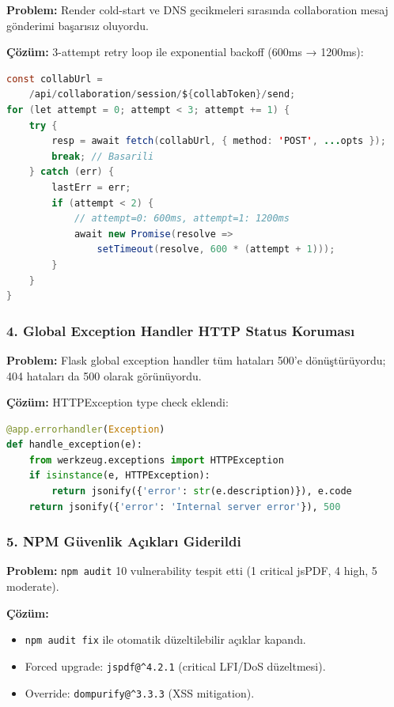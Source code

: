 \documentclass[11pt,a4paper]{article}
\begin{document}
\textbf{Problem:} Render cold-start ve DNS gecikmeleri sırasında collaboration mesaj gönderimi başarısız oluyordu.

\textbf{Çözüm:} 3-attempt retry loop ile exponential backoff (600ms → 1200ms):

\begin{lstlisting}[language=Java, caption={App.jsx:857--885}]
const collabUrl =
    /api/collaboration/session/${collabToken}/send;
for (let attempt = 0; attempt < 3; attempt += 1) {
    try {
        resp = await fetch(collabUrl, { method: 'POST', ...opts });
        break; // Basarili
    } catch (err) {
        lastErr = err;
        if (attempt < 2) {
            // attempt=0: 600ms, attempt=1: 1200ms
            await new Promise(resolve =>
                setTimeout(resolve, 600 * (attempt + 1)));
        }
    }
}
\end{lstlisting}

\subsubsection{4. Global Exception Handler HTTP Status Koruması}

\textbf{Problem:} Flask global exception handler tüm hataları 500'e dönüştürüyordu; 404 hataları da 500 olarak görünüyordu.

\textbf{Çözüm:} HTTPException type check eklendi:

\begin{lstlisting}[language=Python, caption={app.py:532--547}]
@app.errorhandler(Exception)
def handle_exception(e):
    from werkzeug.exceptions import HTTPException
    if isinstance(e, HTTPException):
        return jsonify({'error': str(e.description)}), e.code
    return jsonify({'error': 'Internal server error'}), 500
\end{lstlisting}

\subsubsection{5. NPM Güvenlik Açıkları Giderildi}

\textbf{Problem:} \texttt{npm audit} 10 vulnerability tespit etti (1 critical jsPDF, 4 high, 5 moderate).

\textbf{Çözüm:}
\begin{itemize}[leftmargin=1.5em]
  \item \texttt{npm audit fix} ile otomatik düzeltilebilir açıklar kapandı.
  \item Forced upgrade: \texttt{jspdf@\^{}4.2.1} (critical LFI/DoS düzeltmesi).
  \item Override: \texttt{dompurify@\^{}3.3.3} (XSS mitigation).
\end{itemize}
\end{document}
